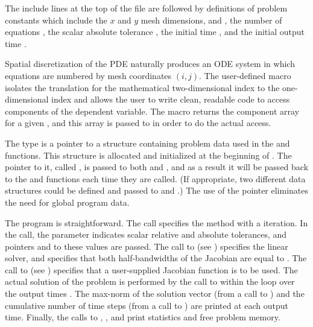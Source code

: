 The include lines at the top of the file are followed by definitions of
problem constants which include the $x$ and $y$ mesh dimensions,  and
, the number of equations , the scalar absolute tolerance
, the initial time , and the initial output time .

Spatial discretization of the PDE naturally produces an ODE system in
which equations are numbered by mesh coordinates $(i,j)$. The
user-defined macro  isolates the translation for the
mathematical two-dimensional index to the one-dimensional
 index and allows the user to write clean, readable code
to access components of the dependent variable.  The 
macro returns the component array for a given , and this
array is passed to  in order to do the actual 
access.

The type  is a pointer to a structure containing problem
data used in the  and  functions.  This structure is
allocated and initialized at the beginning of . The pointer
to it, called , is passed to both  and
, and as a result it will be passed back to the
 and  functions each time they are called.  (If
appropriate, two different data structures could be defined and passed
to  and .)  The use of the  pointer eliminates
the need for global program data.

The  program is straightforward.  The  call
specifies the  method with a  iteration. In the
 call, the parameter  indicates scalar relative
and absolute tolerances, and pointers  and  to
these values are passed.  
The call to  (see ) specifies the {\cvband}
linear solver, and specifies that both half-bandwidths of the Jacobian
are equal to .  
The call to  (see ) specifies
that a user-supplied Jacobian function  is to be used.
The actual solution of the problem is performed by
the call to  within the loop over the output times .
The max-norm of the solution vector (from a call to ) and
the cumulative number of time steps (from a call to ) are
printed at each output time. Finally, the calls to ,
, and  print statistics and free problem memory.

